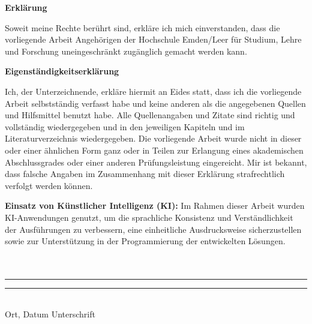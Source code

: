 

\begin{center}
    {\Large \textbf{Erklärung}}
\end{center}
\vspace{.5cm}
Soweit meine Rechte berührt sind, erkläre ich mich einverstanden, dass die vorliegende Arbeit Angehörigen der Hochschule Emden/Leer für Studium, Lehre und Forschung uneingeschränkt zugänglich gemacht werden kann. 

\vspace{2cm}
\begin{center}
    {\Large \textbf{Eigenständigkeitserklärung}}
\end{center}
\vspace{.5cm}
Ich, der Unterzeichnende, erkläre hiermit an Eides statt, dass ich die vorliegende Arbeit selbstständig verfasst habe und keine anderen als die angegebenen Quellen und Hilfsmittel benutzt habe. Alle Quellenangaben und Zitate sind richtig und vollständig wiedergegeben und in den jeweiligen Kapiteln und im Literaturverzeichnis wiedergegeben. Die vorliegende Arbeit wurde nicht in dieser oder einer ähnlichen Form ganz oder in Teilen zur Erlangung eines akademischen Abschlussgrades oder einer anderen Prüfungsleistung eingereicht. Mir ist bekannt, dass falsche Angaben im Zusammenhang mit dieser Erklärung strafrechtlich verfolgt werden können.\newline

\textbf{Einsatz von Künstlicher Intelligenz (KI):}\newline
Im Rahmen dieser Arbeit wurden KI-Anwendungen genutzt, um die sprachliche Konsistenz und Verständlichkeit der Ausführungen zu verbessern, eine einheitliche Ausdrucksweise sicherzustellen sowie zur Unterstützung in der Programmierung der entwickelten Lösungen.
\paragraph{}$~~$\\
\paragraph{}$~~$\\
\vspace{10pt} 
\noindent\rule{5cm}{.4pt}\hfill\rule{5cm}{.4pt}\\%
\noindent Ort, Datum \hfill Unterschrift
\newpage

